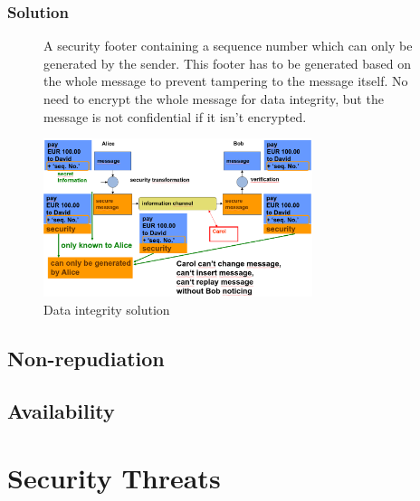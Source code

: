 \documentclass[11pt,british,faculty=ea,layout=titlefont,underline=false,titleUppercase=true,titleUnderline=true,hidelinks]{ugent2016-report}
\begin{document}
            \subsubsection{Solution} \label{subsub:data-integrity-solution}
                \begin{figure}[ht]
                    \begin{minipage}{0.4\textwidth}
                        A security footer containing a sequence number which can only be generated by the sender. This footer has to be generated based on the whole message to prevent tampering to the message itself.
                        No need to encrypt the whole message for data integrity, but the message is not confidential if it isn't encrypted.
                    \end{minipage}
                    \begin{minipage}{0.58\textwidth}
                        \centering
                        \includegraphics[width=0.7\textwidth]{images/data-integrity-solution.png}
                        \caption{Data integrity solution}
                    \end{minipage}
                \end{figure}

        \subsection{Non-repudiation} \label{sub:non-repudiation}

		\subsection{Availability} \label{sub:availability}


	\section{Security Threats} \label{sec:security-threats}


\printbibliography
\end{document}
